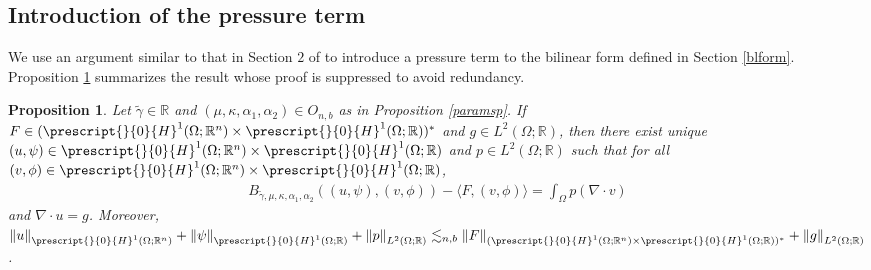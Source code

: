\documentclass[11pt,letterpaper,reqno]{amsart}
\newtheorem{proposition}[theorem]{Proposition}
\numberwithin{equation}{section}
\newcommand{\norm}[1]{\left\lVert#1\right\rVert}
\begin{document}
\subsection{Introduction of the pressure term}
We use an argument similar to that in Section \(2\) of \cite{leoni2023traveling} to introduce a pressure term to the bilinear form defined in Section \ref{blform}. Proposition \ref{wks} summarizes the result whose proof is suppressed to avoid redundancy. 
\begin{proposition} \label{wks}
    Let \(\widetilde{\gamma} \in \mathbb{R}\) and \((\mu,\kappa,\alpha_{1},\alpha_{2}) \in O_{n,b}\) as in Proposition \ref{paramsp}. If \(F \in (\prescript{}{0}{H}^{1}(\Omega;\mathbb{R}^{n}) \times \prescript{}{0}{H}^{1}(\Omega;\mathbb{R}))^{*}\) and \(g \in L^{2}(\Omega;\mathbb{R})\), then there exist unique \((u,\psi) \in \prescript{}{0}{H}^{1}(\Omega;\mathbb{R}^{n}) \times \prescript{}{0}{H}^{1}(\Omega;\mathbb{R})\) and \(p \in L^{2}(\Omega;\mathbb{R})\) such that for all \((v,\phi) \in \prescript{}{0}{H}^{1}(\Omega;\mathbb{R}^{n}) \times \prescript{}{0}{H}^{1}(\Omega;\mathbb{R})\),
    \begin{align}
    B_{\widetilde{\gamma},\mu,\kappa,\alpha_{1},\alpha_{2}}((u,\psi),(v,\phi))-\langle F, (v,\phi)\rangle = \int_{\Omega}p(\nabla \cdot v)
    \end{align}
    and \(\nabla \cdot u =g\). Moreover, \(\norm{u}_{\prescript{}{0}{H}^{1}(\Omega;\mathbb{R}^{n})}+\norm{\psi}_{\prescript{}{0}{H}^{1}(\Omega;\mathbb{R})}+\norm{p}_{L^{2}(\Omega;\mathbb{R})} \lesssim_{n,b} \norm{F}_{(\prescript{}{0}{H}^{1}(\Omega;\mathbb{R}^{n}) \times \prescript{}{0}{H}^{1}(\Omega;\mathbb{R}))^{*}}+\norm{g}_{L^{2}(\Omega;\mathbb{R})}\).
\end{proposition}
\end{document}
